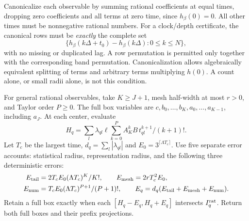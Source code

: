 \documentclass[11pt,reqno]{amsart}
\theoremstyle{remark}\newtheorem{remark}[theorem]{Remark}
\begin{document}
Canonicalize each observable by summing rational coefficients at equal times,
dropping zero coefficients and all terms at zero time, since $h_\beta(0)=0$.
All other times must be nonnegative rational numbers. For a clock/depth
certificate, the canonical rows must be \emph{exactly} the complete set
\begin{equation}
 \bigl\{h_\beta(k\Delta+t_0)-h_\beta(k\Delta):0\le k\le N\bigr\},
 \label{eq:bound-grid}
\end{equation}
with no missing or duplicated lag. A row permutation is permitted only together
with the corresponding band permutation. Canonicalization allows algebraically
equivalent splitting of terms and arbitrary terms multiplying $h(0)$.
A count alone, or small radii alone, is not this condition.

For general rational observables, take $K\ge J+1$, mesh half-width at most
$r>0$, and Taylor order $P\ge0$. The full box variables are
$c,b_0,\ldots,b_K,a_0,\ldots,a_{K-1}$, including $a_J$. At each center,
evaluate
\[
 H_q=\sum_l\lambda_{ql}\ell\sum_{k=0}^P A_K^kB\,
                         t_{ql}^{k+1}/(k+1)!.
\]
Let $T_c$ be the largest time, $d_q=\sum_l|\lambda_{ql}|$ and
$E_0=3^{\lceil\Lambda T_c\rceil}$. Use five separate error accounts:
statistical radius, representation radius, and the following three deterministic
errors:
\begin{equation}
 \begin{split}
 E_{\rm tail}&=2T_cE_0(\Lambda T_c)^K/K!,\qquad
 E_{\rm mesh}=2rT_c^2E_0,\\
 E_{\rm num}&=T_cE_0(\Lambda T_c)^{P+1}/(P+1)!,\qquad
 E_q=d_q(E_{\rm tail}+E_{\rm mesh}+E_{\rm num}).
 \end{split}\label{eq:outer-errors}
\end{equation}
Retain a full box exactly when each $[H_q-E_q,H_q+E_q]$ intersects
$I_q^{\rm rat}$. Return both full boxes and their prefix projections.
\end{document}
